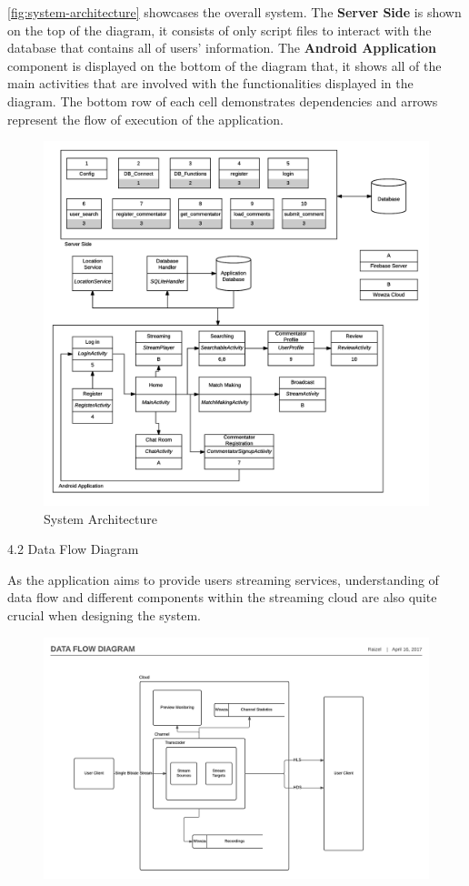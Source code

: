 \documentclass{article}
\begin{document}
\begin{flushleft}
\autoref{fig:system-architecture} showcases the overall system. The \textbf{Server Side} is shown on the top of the diagram, it consists of only script files to interact with the database that contains all of users' information. The \textbf{Android Application} component is displayed on the bottom of the diagram that, it shows all of the main activities that are involved with the functionalities displayed in the diagram. The bottom row of each cell demonstrates dependencies and arrows represent the flow of execution of the application.\par
\begin{figure}[H]
	\centering
	\includegraphics[width=13.5cm]{system-architecture}
	\caption{System Architecture}
	\label{fig:system-architecture}
\end{figure}
{\Large 4.2 Data Flow Diagram}\par
As the application aims to provide users streaming services, understanding of data flow and different components within the streaming cloud are also quite crucial when designing the system.\par
\begin{figure}[H]
	\centering
	\includegraphics[width=14cm]{data-flow-diagram}

\end{figure}
\end{flushleft}
\end{document}
